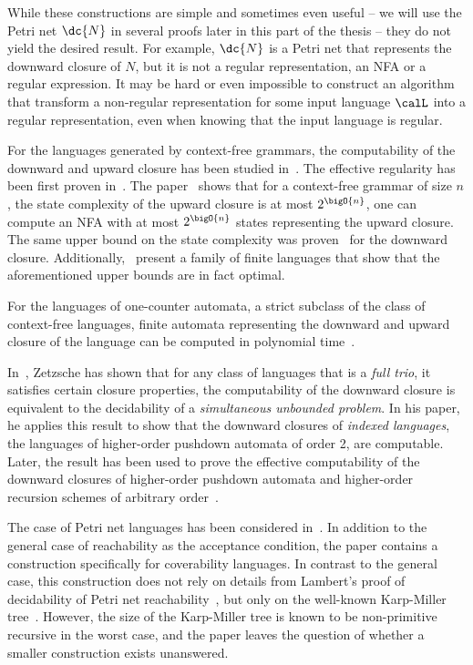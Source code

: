 \documentclass[../../diss.tex]{subfiles}
\begin{document}
While these constructions are simple and sometimes even useful -- we will use the Petri net $\dc{N}$ in several proofs later in this part of the thesis --  they do not yield the desired result.
For example, $\dc{N}$ is a Petri net that represents the downward closure of $N$, but it is not a regular representation, \ie an NFA or a regular expression.
It may be hard or even impossible to construct an algorithm that transform a non-regular representation for some input language $\calL$ into a regular representation, even when knowing that the input language is regular.

For the languages generated by context-free grammars, the computability of the downward and upward closure has been studied in~\cite{vanLeeuwen78,Courcelle91,GruberHK07,BachmeierLS15}.
The effective regularity has been first proven in~\cite{vanLeeuwen78}.
The paper~\cite{GruberHK07} shows that for a context-free grammar of size $n$, the state complexity of the upward closure is at most $2^{\bigO{n}}$, \ie one can compute an NFA with at most $2^{\bigO{n}}$ states representing the upward closure.
The same upper bound on the state complexity was proven~\cite{BachmeierLS15} for the downward closure.
Additionally,~\cite{BachmeierLS15} present a family of finite languages that show that the aforementioned upper bounds are in fact optimal.

For the languages of one-counter automata, a strict subclass of the class of context-free languages, finite automata representing the downward and upward closure of the language can be computed in polynomial time~\cite{AtigCHKSZ16}.

In~\cite{Zetzsche15b}, Zetzsche has shown that for any class of languages that is a \emph{full trio}, \ie it satisfies certain closure properties, the computability of the downward closure is equivalent to the decidability of a \emph{simultaneous unbounded problem}.
In his paper, he applies this result to show that the downward closures of \emph{indexed languages}, the languages of higher-order pushdown automata of order 2, are computable.
Later, the result has been used to prove the effective computability of the downward closures of higher-order pushdown automata and higher-order recursion schemes of arbitrary order~\cite{HagueKO16,ClementePSW16,BarozziniCCP22}.

The case of Petri net languages has been considered in~\cite{HabermehlMW10}.
In addition to the general case of reachability as the acceptance condition, the paper contains a construction specifically for coverability languages.
In contrast to the general case, this construction does not rely on details from Lambert's proof of decidability of Petri net reachability~\cite{Lambert92}, but only on the well-known Karp-Miller tree~\cite{KarpM69}.
However, the size of the Karp-Miller tree is known to be non-primitive recursive in the worst case, and the paper leaves the question of whether a smaller construction exists unanswered.
\end{document}

